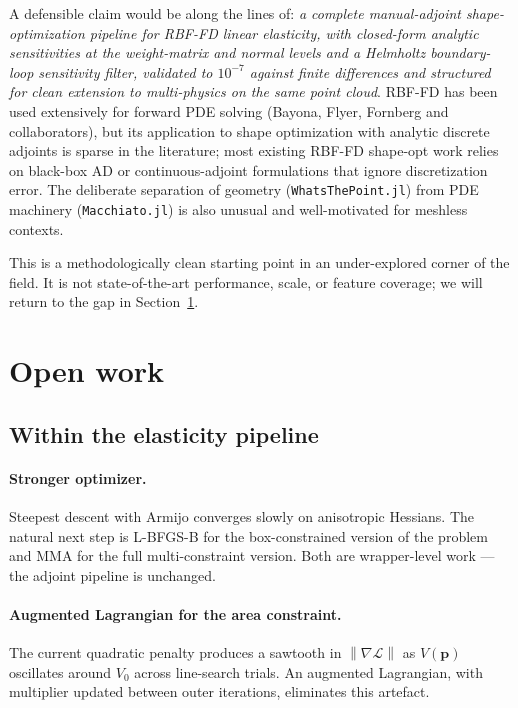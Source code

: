 \documentclass[11pt,a4paper]{article}
\newcommand{\vect}[1]{\boldsymbol{#1}}
\newcommand{\pts}{\vect{p}}
\newcommand{\norm}[1]{\left\lVert#1\right\rVert}
\newcommand{\Loss}{\mathcal{L}}
\begin{document}
A defensible claim would be along the lines of: \emph{a complete
manual-adjoint shape-optimization pipeline for RBF-FD linear
elasticity, with closed-form analytic sensitivities at the
weight-matrix and normal levels and a Helmholtz boundary-loop
sensitivity filter, validated to $10^{-7}$ against finite
differences and structured for clean extension to multi-physics
on the same point cloud}. RBF-FD has been used extensively for
forward PDE solving (Bayona, Flyer, Fornberg and collaborators),
but its application to shape optimization with analytic discrete
adjoints is sparse in the literature; most existing RBF-FD
shape-opt work relies on black-box AD or continuous-adjoint
formulations that ignore discretization error. The deliberate
separation of geometry (\texttt{WhatsThePoint.jl}) from PDE
machinery (\texttt{Macchiato.jl}) is also unusual and
well-motivated for meshless contexts.

This is a methodologically clean starting point in an
under-explored corner of the field. It is not state-of-the-art
performance, scale, or feature coverage; we will return to the
gap in Section~\ref{sec:openwork}.

\section{Open work}
\label{sec:openwork}

\subsection{Within the elasticity pipeline}

\paragraph{Stronger optimizer.}
Steepest descent with Armijo converges slowly on anisotropic
Hessians. The natural next step is L-BFGS-B for the
box-constrained version of the problem and MMA for the full
multi-constraint version. Both are wrapper-level work --- the
adjoint pipeline is unchanged.

\paragraph{Augmented Lagrangian for the area constraint.}
The current quadratic penalty produces a sawtooth in
$\norm{\nabla\Loss}$ as $V(\pts)$ oscillates around $V_0$ across
line-search trials. An augmented Lagrangian, with multiplier
updated between outer iterations, eliminates this artefact.
\end{document}
